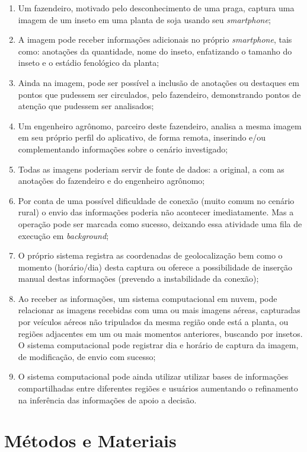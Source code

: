 \documentclass[12pt]{article}
\begin{document}
\begin{enumerate}
	\item Um fazendeiro, motivado pelo desconhecimento de uma praga, captura uma imagem de um inseto em uma planta de soja usando seu \textit{smartphone};
	\item A imagem pode receber informações adicionais no próprio \textit{smartphone}, tais como: anotações da quantidade, nome do inseto, enfatizando o tamanho do inseto e o estádio fenológico da planta;
	\item Ainda na imagem, pode ser possível a inclusão de anotações ou destaques em pontos que pudessem ser circulados, pelo fazendeiro, demonstrando pontos de atenção que pudessem ser analisados;
	\item Um engenheiro agrônomo, parceiro deste fazendeiro, analisa a mesma imagem em seu próprio perfil do aplicativo, de forma remota, inserindo e/ou complementando informações sobre o cenário investigado;
	\item Todas as imagens poderiam servir de fonte de dados: a original, a com as anotações do fazendeiro e do engenheiro agrônomo;
	\item Por conta de uma possível dificuldade de conexão (muito comum no cenário rural) o envio das informações poderia não acontecer imediatamente. Mas a operação pode ser marcada como sucesso, deixando essa atividade uma fila de execução em \textit{background};
	\item O próprio sistema registra as coordenadas de geolocalização bem como o momento (horário/dia) desta captura ou oferece a possibilidade de inserção manual destas informações (prevendo a instabilidade da conexão);
	\item Ao receber as informações, um sistema computacional em nuvem, pode relacionar as imagens recebidas com uma ou mais imagens aéreas, capturadas por veículos aéreos não tripulados da mesma região onde está a planta, ou regiões adjacentes em um ou mais momentos anteriores, buscando por insetos. O sistema computacional pode registrar dia e horário de captura da imagem, de modificação, de envio com sucesso;
	\item O sistema computacional pode ainda utilizar utilizar bases de informações compartilhadas entre diferentes regiões e usuários aumentando o refinamento na inferência das informações de apoio a decisão.
\end{enumerate}

\section{Métodos e Materiais}
\label{sec:metodos_materiais}
		
\end{document}
